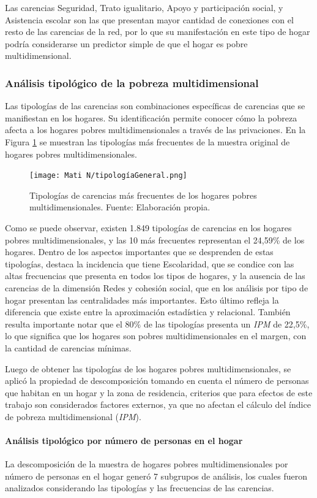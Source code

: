 \documentclass[12pt,letterpaper,spanish]{article}
\begin{document}
Las carencias Seguridad, Trato igualitario, Apoyo y participación social, y Asistencia escolar son las que presentan mayor cantidad de conexiones con el resto de las carencias de la red, por lo que su manifestación en este tipo de hogar podría considerarse un predictor simple de que el hogar es pobre multidimensional. 




\subsubsection{Análisis tipológico de la pobreza multidimensional}
Las tipologías de las carencias son combinaciones específicas de carencias que se manifiestan en los hogares. Su identificación permite conocer cómo la pobreza afecta a los hogares pobres multidimensionales a través de las privaciones. En la Figura \ref{TipGen} se muestran las tipologías más frecuentes de la muestra original de hogares pobres multidimensionales.
\begin{figure}[H]
    \centering
    \texttt{[image: Mati N/tipologíaGeneral.png]}
    \caption{Tipologías de carencias más frecuentes de los hogares pobres multidimensionales. Fuente: Elaboración propia.}
    \label{TipGen}
\end{figure}
Como se puede observar, existen 1.849 tipologías de carencias en los hogares pobres multidimensionales, y las 10 más frecuentes representan el 24,59\% de los hogares. Dentro de los aspectos importantes que se desprenden de estas tipologías, destaca la incidencia que tiene Escolaridad, que se condice con las altas frecuencias que presenta en todos los tipos de hogares, y la ausencia de las carencias de la dimensión Redes y cohesión social, que en los análisis por tipo de hogar presentan las centralidades más importantes. Esto último refleja la diferencia que existe entre la aproximación estadística y relacional. También resulta importante notar que el 80\% de las tipologías presenta un \textit{IPM} de 22,5\%, lo que significa que los hogares son pobres multidimensionales en el margen, con la cantidad de carencias mínimas.

Luego de obtener las tipologías de los hogares pobres multidimensionales, se aplicó la propiedad de descomposición tomando en cuenta el número de personas que habitan en un hogar y la zona de residencia, criterios que para efectos de este trabajo son considerados factores externos, ya que no afectan el cálculo del índice de pobreza multidimensional (\textit{IPM}).

\paragraph{Análisis tipológico por número de personas en el hogar}
La descomposición de la muestra de hogares pobres multidimensionales por número de personas en el hogar generó 7 subgrupos de análisis, los cuales fueron analizados considerando las tipologías y las frecuencias de las carencias. 
\end{document}
